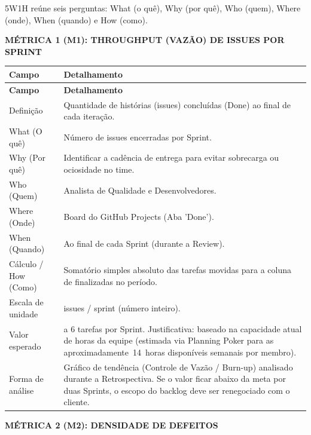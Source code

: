 5W1H reúne seis perguntas: What (o quê), Why (por quê), Who (quem), Where (onde), When (quando) e How (como).

\textbf{MÉTRICA 1 (M1): THROUGHPUT (VAZÃO) DE ISSUES POR SPRINT}

\begingroup
\small
\setlength{\tabcolsep}{4pt}
\renewcommand{\arraystretch}{1.2}
\begin{longtable}{|>{\raggedright\arraybackslash}p{}|>{\raggedright\arraybackslash}p{}|}
\hline
\textbf{Campo} & \textbf{Detalhamento} \\ \hline
\endfirsthead
\textbf{Campo} & \textbf{Detalhamento} \\ \hline
\endhead
Definição & Quantidade de histórias (issues) concluídas (Done) ao final de cada iteração. \\ \hline
What (O quê) & Número de issues encerradas por Sprint. \\ \hline
Why (Por quê) & Identificar a cadência de entrega para evitar sobrecarga ou ociosidade no time. \\ \hline
Who (Quem) & Analista de Qualidade e Desenvolvedores. \\ \hline
Where (Onde) & Board do GitHub Projects (Aba 'Done'). \\ \hline
When (Quando) & Ao final de cada Sprint (durante a Review). \\ \hline
Cálculo / How (Como) & Somatório simples absoluto das tarefas movidas para a coluna de finalizadas no período. \\ \hline
Escala de unidade & issues / sprint (número inteiro). \\ \hline
Valor esperado & 4 a 6 tarefas por Sprint. Justificativa: baseado na capacidade atual de horas da equipe (estimada via Planning Poker para as \mbox{aproximadamente 14 horas} disponíveis semanais por membro). \\ \hline
Forma de análise & Gráfico de tendência (Controle de Vazão / Burn-up) analisado durante a Retrospectiva. Se o valor ficar abaixo da meta por duas Sprints, o escopo do backlog deve ser renegociado com o cliente. \\ \hline
\end{longtable}
\endgroup

\textbf{MÉTRICA 2 (M2): DENSIDADE DE DEFEITOS}

